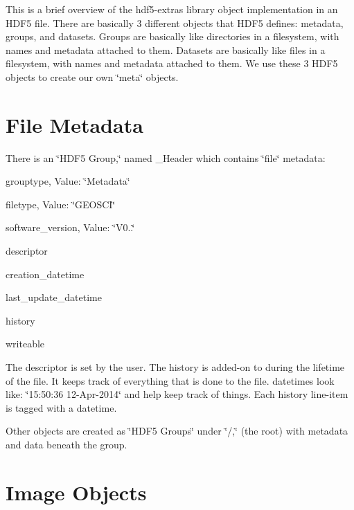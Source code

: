 This is a brief overview of the hdf5-\/extras library object implementation in an H\+D\+F5 file. There are basically 3 different objects that H\+D\+F5 defines\+: metadata, groups, and datasets. Groups are basically like directories in a filesystem, with names and metadata attached to them. Datasets are basically like files in a filesystem, with names and metadata attached to them. We use these 3 H\+D\+F5 objects to create our own \char`\"{}meta\char`\"{} objects.\hypertarget{file_format_file_format_file_metadata}{}\section{File Metadata}\label{file_format_file_format_file_metadata}

There is an \char`\"{}\+H\+D\+F5 Group,\char`\"{} named {\ttfamily \+\_\+\+Header} which contains \char`\"{}file\char`\"{} metadata\+: \begin{DoxyItemize}
\item grouptype, Value\+: \char`\"{}\+Metadata\char`\"{} \item filetype, Value\+: \char`\"{}\+G\+E\+O\+S\+C\+I\char`\"{} \item software\+\_\+version, Value\+: \char`\"{}\+V0..\char`\"{} \item descriptor \item creation\+\_\+datetime \item last\+\_\+update\+\_\+datetime \item history \item writeable\end{DoxyItemize}
The descriptor is set by the user. The history is added-\/on to during the lifetime of the file. It keeps track of everything that is done to the file. datetime\textquotesingle{}s look like\+: \char`\"{}15\+:50\+:36 12-\/\+Apr-\/2014\char`\"{} and help keep track of things. Each history line-\/item is tagged with a datetime.

Other objects are created as \char`\"{}\+H\+D\+F5 Groups\char`\"{} under \char`\"{}/,\char`\"{} (the root) with metadata and data beneath the group.\hypertarget{file_format_file_format_image_objects}{}\section{Image Objects}\label{file_format_file_format_image_objects}

